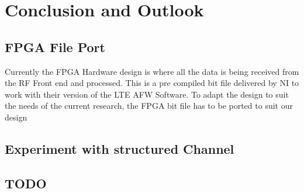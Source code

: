 \chapter{Conclusion and Outlook}\label{ch:conOutlook}

\section{FPGA File Port}\label{sec:FPGAChange}
Currently the FPGA Hardware design is where all the data is being received from the RF Front end and processed. This is a pre compiled bit file delivered by NI to work with their version of the LTE AFW Software. To adapt the design to suit the needs of the current research, the FPGA bit file has to be ported to suit our design 


\section{Experiment with structured Channel}\label{sec:StrucChannel}

\section{TODO}\label{sec:}

